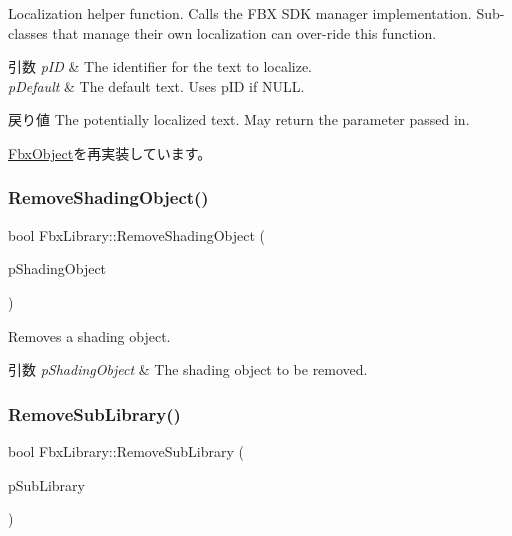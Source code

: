 Localization helper function. Calls the F\+BX S\+DK manager implementation. Sub-\/classes that manage their own localization can over-\/ride this function. 
\begin{DoxyParams}{引数}
{\em p\+ID} & The identifier for the text to localize. \\
\hline
{\em p\+Default} & The default text. Uses p\+ID if N\+U\+LL. \\
\hline
\end{DoxyParams}
\begin{DoxyReturn}{戻り値}
The potentially localized text. May return the parameter passed in. 
\end{DoxyReturn}


\hyperlink{class_fbx_object_a9b8ae43ccdd09be07b450e0ed54788ab}{Fbx\+Object}を再実装しています。

\mbox{\label{class_fbx_library_aafacfb4acfe28124217e4b0ffb0dcadc}} 
\subsubsection{\texorpdfstring{Remove\+Shading\+Object()}{RemoveShadingObject()}}
{\footnotesize\ttfamily bool Fbx\+Library\+::\+Remove\+Shading\+Object (\begin{DoxyParamCaption}\item[{\hyperlink{class_fbx_object}{Fbx\+Object} $\ast$}]{p\+Shading\+Object }\end{DoxyParamCaption})}

Removes a shading object. 
\begin{DoxyParams}{引数}
{\em p\+Shading\+Object} & The shading object to be removed. \\
\hline
\end{DoxyParams}
\mbox{\label{class_fbx_library_af49b9811d383dbdc86bc805b72970ad9}} 
\subsubsection{\texorpdfstring{Remove\+Sub\+Library()}{RemoveSubLibrary()}}
{\footnotesize\ttfamily bool Fbx\+Library\+::\+Remove\+Sub\+Library (\begin{DoxyParamCaption}\item[{\hyperlink{class_fbx_library}{Fbx\+Library} $\ast$}]{p\+Sub\+Library }\end{DoxyParamCaption})}


